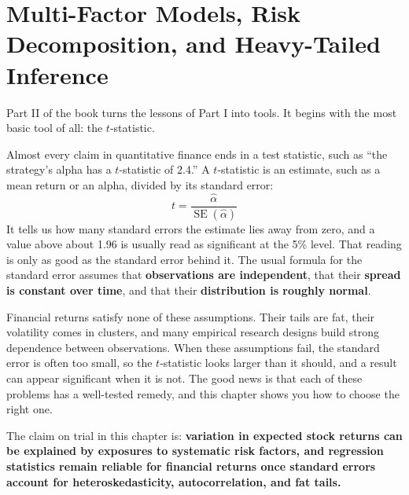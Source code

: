 \chapter{Multi-Factor Models, Risk Decomposition, and Heavy-Tailed Inference}
\label{ch:03}

Part II of the book turns the lessons of Part I into tools. It begins with the most basic tool of all: the $t$-statistic.

Almost every claim in quantitative finance ends in a test statistic, such as ``the strategy's alpha has a $t$-statistic of 2.4.'' A $t$-statistic is an estimate, such as a mean return or an alpha, divided by its standard error:
\begin{equation}
  t = \frac{\hat{\alpha}}{\operatorname{SE}(\hat{\alpha})}
  \label{eq:03-tstat}
\end{equation}
It tells us how many standard errors the estimate lies away from zero, and a value above about 1.96 is usually read as significant at the 5\% level. That reading is only as good as the standard error behind it. The usual formula for the standard error assumes that \textbf{observations are independent}, that their \textbf{spread is constant over time}, and that their \textbf{distribution is roughly normal}.

Financial returns satisfy none of these assumptions. Their tails are fat, their volatility comes in clusters, and many empirical research designs build strong dependence between observations. When these assumptions fail, the standard error is often too small, so the $t$-statistic looks larger than it should, and a result can appear significant when it is not. The good news is that each of these problems has a well-tested remedy, and this chapter shows you how to choose the right one.

The claim on trial in this chapter is: \textbf{variation in expected stock returns can be explained by exposures to systematic risk factors, and regression statistics remain reliable for financial returns once standard errors account for heteroskedasticity, autocorrelation, and fat tails.}

